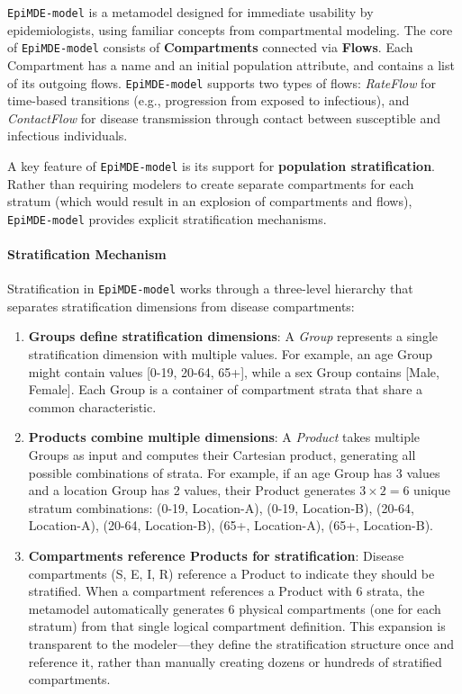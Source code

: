\texttt{EpiMDE-model} is a metamodel designed for immediate usability by epidemiologists, using familiar concepts from compartmental modeling. The core of \texttt{EpiMDE-model} consists of \textbf{Compartments} connected via \textbf{Flows}. Each Compartment has a name and an initial population attribute, and contains a list of its outgoing flows. \texttt{EpiMDE-model} supports two types of flows: \textit{RateFlow} for time-based transitions (e.g., progression from exposed to infectious), and \textit{ContactFlow} for disease transmission through contact between susceptible and infectious individuals.

A key feature of \texttt{EpiMDE-model} is its support for \textbf{population stratification}. Rather than requiring modelers to create separate compartments for each stratum (which would result in an explosion of compartments and flows), \texttt{EpiMDE-model} provides explicit stratification mechanisms.

\paragraph{Stratification Mechanism}

Stratification in \texttt{EpiMDE-model} works through a three-level hierarchy that separates stratification dimensions from disease compartments:

\begin{enumerate}
    \item \textbf{Groups define stratification dimensions}: A \textit{Group} represents a single stratification dimension with multiple values. For example, an age Group might contain values [0-19, 20-64, 65+], while a sex Group contains [Male, Female]. Each Group is a container of compartment strata that share a common characteristic.

    \item \textbf{Products combine multiple dimensions}: A \textit{Product} takes multiple Groups as input and computes their Cartesian product, generating all possible combinations of strata. For example, if an age Group has 3 values and a location Group has 2 values, their Product generates $3 \times 2 = 6$ unique stratum combinations: (0-19, Location-A), (0-19, Location-B), (20-64, Location-A), (20-64, Location-B), (65+, Location-A), (65+, Location-B).

    \item \textbf{Compartments reference Products for stratification}: Disease compartments (S, E, I, R) reference a Product to indicate they should be stratified. When a compartment references a Product with 6 strata, the metamodel automatically generates 6 physical compartments (one for each stratum) from that single logical compartment definition. This expansion is transparent to the modeler---they define the stratification structure once and reference it, rather than manually creating dozens or hundreds of stratified compartments.
\end{enumerate}


